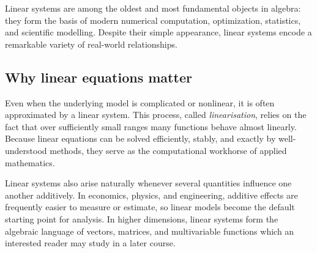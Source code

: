  Linear systems are among the oldest and most fundamental objects
in algebra: they form the basis of modern numerical computation,
optimization, statistics, and scientific modelling.  Despite their simple
appearance, linear systems encode a remarkable variety of real-world
relationships.

\subsection{Why linear equations matter}

Even when the underlying model is complicated or nonlinear, it is often
approximated by a linear system.  This process, called \emph{linearisation},
relies on the fact that over sufficiently small ranges many functions behave
almost linearly.  Because linear equations can be solved efficiently,
stably, and exactly by well-understood methods, they serve as the computational
workhorse of applied mathematics.

Linear systems also arise naturally whenever several quantities influence
one another additively.  In economics, physics, and engineering, additive
effects are frequently easier to measure or estimate, so linear models
become the default starting point for analysis.  In higher dimensions,
linear systems form the algebraic language of vectors, matrices, and
multivariable functions which an interested reader may study in a later course.


